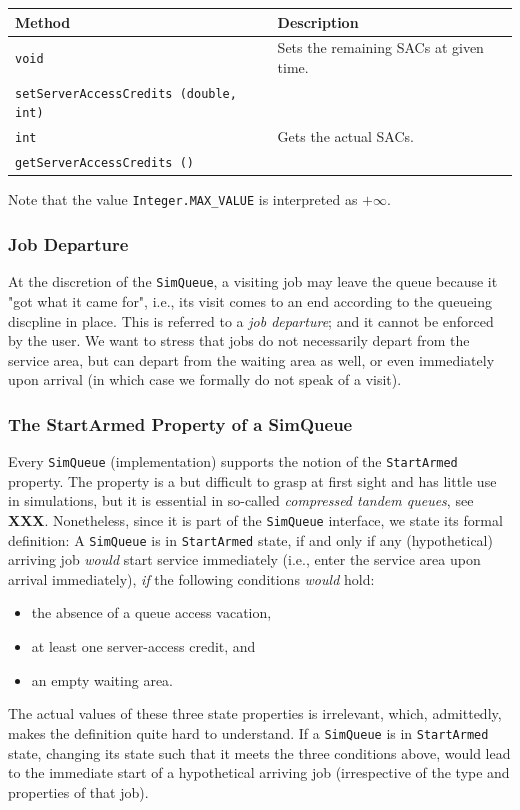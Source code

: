 \documentclass[12pt]{book}
\begin{document}
\begin{tabular}{|l|l|}
  \hline
  {\bf Method} & {\bf Description} \\
  \hline
  \lstinline[basicstyle=\footnotesize]!void!
    & Sets the remaining SACs at given time.
    \\
  \lstinline[basicstyle=\footnotesize]!setServerAccessCredits (double, int)!
    &
    \\ \hline
  \lstinline[basicstyle=\footnotesize]!int!
    & Gets the actual SACs.
    \\
  \lstinline[basicstyle=\footnotesize]!getServerAccessCredits ()!
    &
    \\ \hline
\end{tabular}

Note that the value \lstinline-Integer.MAX_VALUE- is interpreted as $+\infty$.

\subsubsection{Job Departure}

At the discretion of the \lstinline|SimQueue|,
  a visiting job may leave the queue
  because it "got what it came for",
  i.e.,
  its visit comes to an end
  according to the queueing discpline in place.
This is referred to a {\em job departure\/};
  and it cannot be enforced by the user.
We want to stress that jobs do not necessarily
  depart from the service area,
  but can depart from the waiting area as well,
  or even immediately upon arrival
  (in which case we formally do not speak of a visit).

\subsubsection{The StartArmed Property of a SimQueue}
\label{sec-start-armed}

Every \lstinline|SimQueue| (implementation) supports the notion of the
  \lstinline|StartArmed| property.
The property is a but difficult to grasp at first sight
  and has little use in simulations,
  but it is essential in so-called {\em compressed tandem queues},
  see {\bf XXX}.
Nonetheless, since it is part of the \lstinline-SimQueue- interface,
  we state its formal definition:
A \lstinline-SimQueue- is in \lstinline-StartArmed- state,
  if and only if any (hypothetical) arriving job {\em would\/} start service immediately
  (i.e., enter the service area upon arrival immediately),
  {\em if\/} the following conditions {\em would\/} hold:
\begin{itemize}
\item the absence of a queue access vacation,
\item at least one server-access credit, and
\item an empty waiting area. 
\end{itemize}
The actual values of these three state properties is irrelevant,
  which, admittedly, makes the definition quite hard to understand.
If a \lstinline-SimQueue- is in \lstinline-StartArmed- state,
  changing its state such that it meets the three conditions above,
  would lead to the immediate start of a hypothetical arriving job
  (irrespective of the type and properties of that job).
\end{document}
